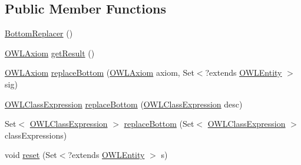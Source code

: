 \subsection*{Public Member Functions}
\begin{DoxyCompactItemize}
\item 
\hyperlink{classcom_1_1clarkparsia_1_1owlapi_1_1modularity_1_1locality_1_1_semantic_locality_evaluator_1_1_bottom_replacer_af4cfca5f36cbbd94e24002f030c4e697}{Bottom\-Replacer} ()
\item 
\hyperlink{interfaceorg_1_1semanticweb_1_1owlapi_1_1model_1_1_o_w_l_axiom}{O\-W\-L\-Axiom} \hyperlink{classcom_1_1clarkparsia_1_1owlapi_1_1modularity_1_1locality_1_1_semantic_locality_evaluator_1_1_bottom_replacer_ac9c0c7c8f348777e124261a56689016d}{get\-Result} ()
\item 
\hyperlink{interfaceorg_1_1semanticweb_1_1owlapi_1_1model_1_1_o_w_l_axiom}{O\-W\-L\-Axiom} \hyperlink{classcom_1_1clarkparsia_1_1owlapi_1_1modularity_1_1locality_1_1_semantic_locality_evaluator_1_1_bottom_replacer_a16cca723e484af5c293bee44fc0a6a7f}{replace\-Bottom} (\hyperlink{interfaceorg_1_1semanticweb_1_1owlapi_1_1model_1_1_o_w_l_axiom}{O\-W\-L\-Axiom} axiom, Set$<$?extends \hyperlink{interfaceorg_1_1semanticweb_1_1owlapi_1_1model_1_1_o_w_l_entity}{O\-W\-L\-Entity} $>$ sig)
\item 
\hyperlink{interfaceorg_1_1semanticweb_1_1owlapi_1_1model_1_1_o_w_l_class_expression}{O\-W\-L\-Class\-Expression} \hyperlink{classcom_1_1clarkparsia_1_1owlapi_1_1modularity_1_1locality_1_1_semantic_locality_evaluator_1_1_bottom_replacer_a09a0915e28dfef5a779b28984435d0ff}{replace\-Bottom} (\hyperlink{interfaceorg_1_1semanticweb_1_1owlapi_1_1model_1_1_o_w_l_class_expression}{O\-W\-L\-Class\-Expression} desc)
\item 
Set$<$ \hyperlink{interfaceorg_1_1semanticweb_1_1owlapi_1_1model_1_1_o_w_l_class_expression}{O\-W\-L\-Class\-Expression} $>$ \hyperlink{classcom_1_1clarkparsia_1_1owlapi_1_1modularity_1_1locality_1_1_semantic_locality_evaluator_1_1_bottom_replacer_a24b129eab9b8fffbefaeaabca561d0c0}{replace\-Bottom} (Set$<$ \hyperlink{interfaceorg_1_1semanticweb_1_1owlapi_1_1model_1_1_o_w_l_class_expression}{O\-W\-L\-Class\-Expression} $>$ class\-Expressions)
\item 
void \hyperlink{classcom_1_1clarkparsia_1_1owlapi_1_1modularity_1_1locality_1_1_semantic_locality_evaluator_1_1_bottom_replacer_a0480ebe26ec0651879f9d2bbf0b2fcc2}{reset} (Set$<$?extends \hyperlink{interfaceorg_1_1semanticweb_1_1owlapi_1_1model_1_1_o_w_l_entity}{O\-W\-L\-Entity} $>$ s)

\end{DoxyCompactItemize}
